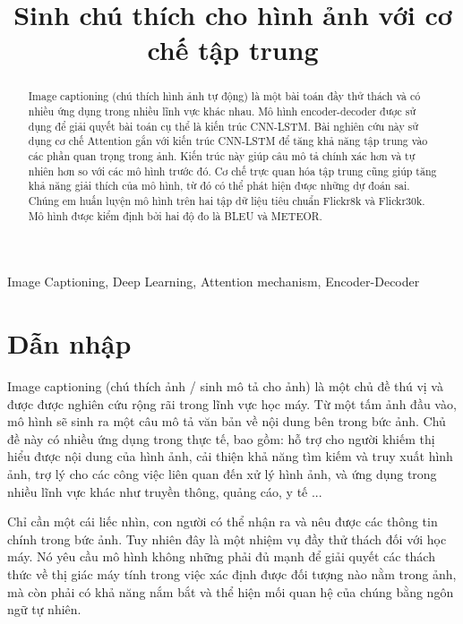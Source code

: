 \documentclass[conference]{IEEEtran}
\begin{document}
\title{Sinh chú thích cho hình ảnh với cơ chế tập trung\\}
\author{
}
\maketitle

\begin{abstract}
Image captioning (chú thích hình ảnh tự động) là một bài toán đầy thử thách và có nhiều ứng dụng trong nhiều lĩnh vực khác nhau.
Mô hình encoder-decoder được sử dụng để giải quyết bài toán cụ thể là kiến trúc CNN-LSTM.
Bài nghiên cứu này sử dụng cơ chế Attention gắn với kiến trúc CNN-LSTM để tăng khả năng tập trung vào các phần quan trọng trong ảnh.
Kiến trúc này giúp câu mô tả chính xác hơn và tự nhiên hơn so với các mô hình trước đó.
Cơ chế trực quan hóa tập trung cũng giúp tăng khả năng giải thích của mô hình, từ đó có thể phát hiện được những dự đoán sai.
Chúng em huấn luyện mô hình trên hai tập dữ liệu tiêu chuẩn Flickr8k và Flickr30k. Mô hình được kiểm định bởi hai độ đo là BLEU và METEOR.
\end{abstract} 

\begin{IEEEkeywords}
Image Captioning, Deep Learning, Attention mechanism, Encoder-Decoder
\end{IEEEkeywords}

\section{Dẫn nhập}
Image captioning (chú thích ảnh / sinh mô tả cho ảnh) là một chủ đề thú vị và được được nghiên cứu rộng rãi trong lĩnh vực học máy.
Từ một tấm ảnh đầu vào, mô hình sẽ sinh ra một câu mô tả văn bản về nội dung bên trong bức ảnh.
Chủ đề này có nhiều ứng dụng trong thực tế, bao gồm: hỗ trợ cho người khiếm thị hiểu được nội dung của hình ảnh, cải thiện khả năng tìm kiếm và truy xuất hình ảnh, trợ lý cho các công việc liên quan đến xử lý hình ảnh, và ứng dụng trong nhiều lĩnh vực khác như truyền thông, quảng cáo, y tế ... 

Chỉ cần một cái liếc nhìn, con người có thể nhận ra và nêu được các thông tin chính trong bức ảnh\cite{fei2007we}.
Tuy nhiên đây là một nhiệm vụ đầy thử thách đối với học máy.
Nó yêu cầu mô hình không những phải đủ mạnh để giải quyết các thách thức về thị giác máy tính trong việc xác định được đối tượng nào nằm trong ảnh, mà còn phải có khả năng nắm bắt và thể hiện mối quan hệ của chúng bằng ngôn ngữ tự nhiên.
\end{document}
